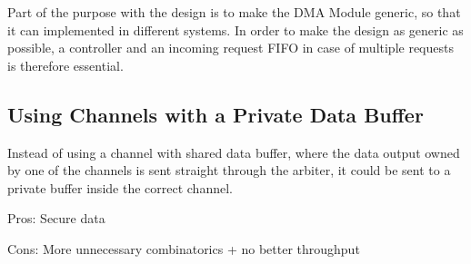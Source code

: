 Part of the purpose with the design is to make the DMA Module generic, so that it can implemented in different systems.
In order to make the design as generic as possible, a controller and an incoming request FIFO
in case of multiple requests is therefore essential.

\subsection{Using Channels with a Private Data Buffer}
Instead of using a channel with shared data buffer, where the data output owned by
one of the channels is sent straight through the arbiter, it could be sent to a
private buffer inside the correct channel.

Pros: Secure data

Cons: More unnecessary combinatorics + no better throughput

